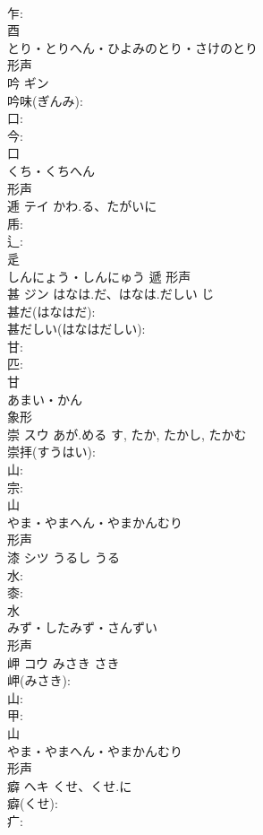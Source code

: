 \documentclass[8pt]{extreport}
\begin{document}
\begin{CJK}{UTF8}{min}
\\	乍: 
\\	酉	
\\	とり・とりへん・ひよみのとり・さけのとり	
\\	形声 
\\	吟	ギン			
\\	吟味(ぎんみ): 
\\	口: 
\\	今: 
\\	口	
\\	くち・くちへん	
\\	形声 
\\	逓	テイ	かわ.る、たがいに		
\\	乕: 
\\	辶: 
\\	辵	
\\	しんにょう・しんにゅう	遞	形声 
\\	甚	ジン	はなは.だ、はなは.だしい	じ	
\\	甚だ(はなはだ): 
\\	甚だしい(はなはだしい): 
\\	甘: 
\\	匹: 
\\	甘	
\\	あまい・かん	
\\	象形 
\\	崇	スウ	あが.める	す, たか, たかし, たかむ	
\\	崇拝(すうはい): 
\\	山: 
\\	宗: 
\\	山	
\\	やま・やまへん・やまかんむり	
\\	形声 
\\	漆	シツ	うるし	うる	
\\	水: 
\\	桼: 
\\	水	
\\	みず・したみず・さんずい	
\\	形声 
\\	岬	コウ	みさき	さき	
\\	岬(みさき): 
\\	山: 
\\	甲: 
\\	山	
\\	やま・やまへん・やまかんむり	
\\	形声 
\\	癖	ヘキ	くせ、くせ.に		
\\	癖(くせ): 
\\	疒: 

\end{CJK}
\end{document}

